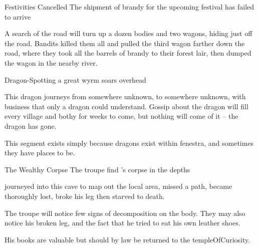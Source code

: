 \begin{multicols}{2}
{Festivities Cancelled}%
{The shipment of brandy for the upcoming festival has failed to arrive}%

A search of the road will turn up a dozen bodies and two wagons, hiding just off the road.
Bandits killed them all and pulled the third wagon farther down the road, where they took all the barrels of brandy to their forest lair, then dumped the wagon in the nearby river.

{Dragon-Spotting}%
{a great wyrm soars overhead}%

This dragon journeys from somewhere unknown, to somewhere unknown, with business that only a dragon could understand.
Gossip about the dragon will fill every \gls{village} and \gls{bothy} for weeks to come, but nothing will come of it -- the dragon has gone.

This \gls{segment} exists simply because dragons exist within \gls{fenestra}, and sometimes they have places to be.

{The Wealthy Corpse}%
{The troupe find 's corpse in the depths}%

\begin{exampletext}
   journeyed into this cave to map out the local area, missed a path, became thoroughly lost, broke his leg then starved to death.
\end{exampletext}

The troupe will notice few signs of decomposition on the body.
They may also notice his broken leg, and the fact that he tried to eat his own leather shoes.

His books are valuable but should by law be returned to the \gls{templeOfCuriosity}.

\stopcontents[sq]

\end{multicols}

